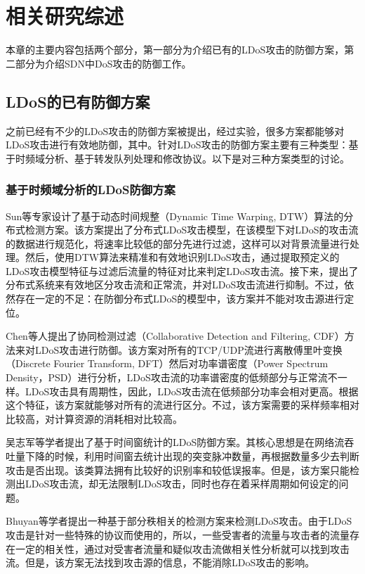 \chapter{相关研究综述}
\label{cha:relatedWork}

本章的主要内容包括两个部分，第一部分为介绍已有的LDoS攻击的防御方案，第二部分为介绍SDN中DoS攻击的防御工作。

\section{LDoS的已有防御方案}
\label{chap2:LDoSwork}
之前已经有不少的LDoS攻击的防御方案被提出，经过实验，很多方案都能够对LDoS攻击进行有效地防御，其中。针对LDoS攻击的防御方案主要有三种类型：基于时频域分析、基于转发队列处理和修改协议。以下是对三种方案类型的讨论。


\subsection{基于时频域分析的LDoS防御方案}
\label{chap2:TFanalysis}

Sun\cite{b4}等专家设计了基于动态时间规整（Dynamic Time Warping, DTW）算法的分布式检测方案。该方案提出了分布式LDoS攻击模型，在该模型下对LDoS的攻击流的数据进行规范化，将速率比较低的部分先进行过滤，这样可以对背景流量进行处理。然后，使用DTW算法来精准和有效地识别LDoS攻击，通过提取预定义的LDoS攻击模型特征与过滤后流量的特征对比来判定LDoS攻击流。接下来，提出了分布式系统来有效地区分攻击流和正常流，并对LDoS攻击流进行抑制。不过，依然存在一定的不足：在防御分布式LDoS的模型中，该方案并不能对攻击源进行定位。

Chen\cite{b7}等人提出了协同检测过滤（Collaborative Detection and Filtering, CDF）方法来对LDoS攻击进行防御。该方案对所有的TCP/UDP流进行离散傅里叶变换（Discrete Fourier Transform, DFT）然后对功率谱密度（Power Spectrum Density，PSD）进行分析，LDoS攻击流的功率谱密度的低频部分与正常流不一样。LDoS攻击具有周期性，因此，LDoS攻击流在低频部分功率会相对更高。根据这个特征，该方案就能够对所有的流进行区分。不过，该方案需要的采样频率相对比较高，对计算资源的消耗相对比较高。

吴志军\cite{wuLDoSdetect}等学者提出了基于时间窗统计的LDoS防御方案。其核心思想是在网络流吞吐量下降的时候，利用时间窗去统计出现的突变脉冲数量，再根据数量多少去判断攻击是否出现。该类算法拥有比较好的识别率和较低误报率。但是，该方案只能检测出LDoS攻击流，却无法限制LDoS攻击，同时也存在着采样周期如何设定的问题。

Bhuyan\cite{bhuyan2015low}等学者提出一种基于部分秩相关的检测方案来检测LDoS攻击。由于LDoS攻击是针对一些特殊的协议而使用的，所以，一些受害者的流量与攻击者的流量存在一定的相关性，通过对受害者流量和疑似攻击流做相关性分析就可以找到攻击流。但是，该方案无法找到攻击源的信息，不能消除LDoS攻击的影响。

